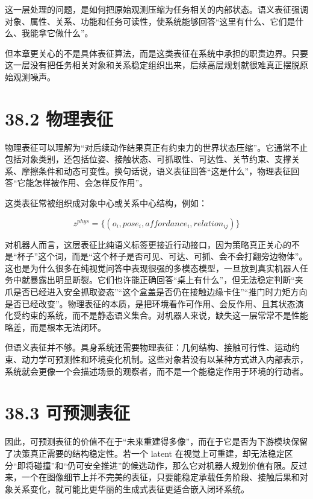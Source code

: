 这一层处理的问题，是如何把原始观测压缩为任务相关的内部状态。语义表征强调对象、属性、关系、功能和任务可读性，使系统能够回答“这里有什么、它们是什么、我能拿它做什么”。

但本章更关心的不是具体表征算法，而是这类表征在系统中承担的职责边界。只要这一层没有把任务相关对象和关系稳定组织出来，后续高层规划就很难真正摆脱原始观测噪声。

\section*{38.2 物理表征}


物理表征可以理解为“对后续动作结果真正有约束力的世界状态压缩”。它通常不止包括对象类别，还包括位姿、接触状态、可抓取性、可达性、关节约束、支撑关系、摩擦条件和动态可变性。换句话说，语义表征回答“这是什么”，物理表征回答“它能怎样被作用、会怎样反作用”。

这类表征常被组织成对象中心或关系中心结构，例如：

\begingroup
\footnotesize
\begin{equation*}
z^{phys} = \{(o_i, pose_i, affordance_i, relation_{ij})\}
\end{equation*}
\endgroup

对机器人而言，这层表征比纯语义标签更接近行动接口，因为策略真正关心的不是“杯子”这个词，而是“这个杯子是否可见、可达、可抓、会不会打翻旁边物体”。 这也是为什么很多在纯视觉问答中表现很强的多模态模型，一旦放到真实机器人任务中就暴露出明显断裂。它们也许能正确回答“桌上有什么”，但无法稳定判断“夹爪是否已经进入安全抓取姿态”“这个盒盖是否仍在接触边缘卡住”“推门时力矩方向是否已经改变”。物理表征的本质，是把环境看作可作用、会反作用、且其状态演化受约束的系统，而不是静态语义集合。对机器人来说，缺失这一层常常不是性能略差，而是根本无法闭环。

但语义表征并不够。具身系统还需要物理表征：几何结构、接触可行性、运动约束、动力学可预测性和环境变化机制。这些对象若没有以某种方式进入内部表示，系统就会更像一个会描述场景的观察者，而不是一个能稳定作用于环境的行动者。

\section*{38.3 可预测表征}


因此，可预测表征的价值不在于“未来重建得多像”，而在于它是否为下游模块保留了决策真正需要的结构稳定性。若一个 latent 在视觉上可重建，却无法稳定区分“即将碰撞”和“仍可安全推进”的候选动作，那么它对机器人规划价值有限。反过来，一个在图像细节上并不完美的表征，只要能稳定承载任务阶段、接触后果和对象关系变化，就可能比更华丽的生成式表征更适合嵌入闭环系统。

